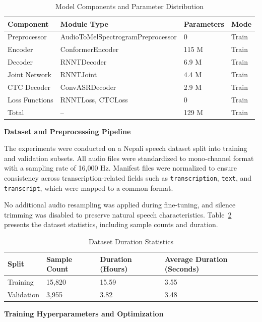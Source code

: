 \begin{table}[H]
\caption{Model Components and Parameter Distribution}
\label{tab:indic_model}
\centering
\begin{tabular}{|l|l|l|l|}
\hline
\textbf{Component} & \textbf{Module Type} & \textbf{Parameters} & \textbf{Mode} \\
\hline
Preprocessor & AudioToMelSpectrogramPreprocessor & 0 & Train \\
Encoder & ConformerEncoder & 115 M & Train \\
Decoder & RNNTDecoder & 6.9 M & Train \\
Joint Network & RNNTJoint & 4.4 M & Train \\
CTC Decoder & ConvASRDecoder & 2.9 M & Train \\
Loss Functions & RNNTLoss, CTCLoss & 0 & Train \\
Total & -- & 129 M & Train \\
\hline
\end{tabular}
\end{table}

\textbf{Dataset and Preprocessing Pipeline}

The experiments were conducted on a Nepali speech dataset split into training and validation subsets. All audio files were standardized to mono-channel format with a sampling rate of 16,000 Hz. Manifest files were normalized to ensure consistency across transcription-related fields such as \texttt{transcription}, \texttt{text}, and \texttt{transcript}, which were mapped to a common format.

No additional audio resampling was applied during fine-tuning, and silence trimming was disabled to preserve natural speech characteristics. Table~\ref{tab:indic_dataset} presents the dataset statistics, including sample counts and duration.

\begin{table}[H]
\caption{Dataset Duration Statistics}
\label{tab:indic_dataset}
\centering
\begin{tabular}{|l|l|l|l|}
\hline
\textbf{Split} & \textbf{Sample Count} & \textbf{Duration (Hours)} & \textbf{Average Duration (Seconds)} \\
\hline
Training & 15,820 & 15.59 & 3.55 \\
Validation & 3,955 & 3.82 & 3.48 \\
\hline
\end{tabular}
\end{table}

\textbf{Training Hyperparameters and Optimization}

